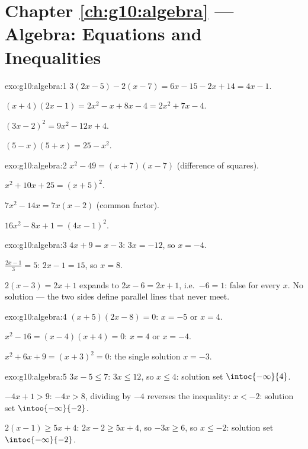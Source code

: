 \section*{Chapter \ref{ch:g10:algebra} --- Algebra: Equations and Inequalities}

\begin{solution}{exo:g10:algebra:1}
$3(2x-5) - 2(x-7) = 6x - 15 - 2x + 14 = 4x - 1$.

$(x+4)(2x-1) = 2x^2 - x + 8x - 4 = 2x^2 + 7x - 4$.

$(3x-2)^2 = 9x^2 - 12x + 4$.

$(5-x)(5+x) = 25 - x^2$.
\end{solution}

\begin{solution}{exo:g10:algebra:2}
$x^2 - 49 = (x+7)(x-7)$ (difference of squares).

$x^2 + 10x + 25 = (x+5)^2$.

$7x^2 - 14x = 7x(x - 2)$ (common factor).

$16x^2 - 8x + 1 = (4x - 1)^2$.
\end{solution}

\begin{solution}{exo:g10:algebra:3}
$4x + 9 = x - 3$: $3x = -12$, so $x = -4$.

$\frac{2x-1}{3} = 5$: $2x - 1 = 15$, so $x = 8$.

$2(x-3) = 2x + 1$ expands to $2x - 6 = 2x + 1$, i.e.\ $-6 = 1$: false for
every $x$. No solution --- the two sides define parallel lines that never
meet.
\end{solution}

\begin{solution}{exo:g10:algebra:4}
$(x+5)(2x-8) = 0$: $x = -5$ or $x = 4$.

$x^2 - 16 = (x-4)(x+4) = 0$: $x = 4$ or $x = -4$.

$x^2 + 6x + 9 = (x+3)^2 = 0$: the single solution $x = -3$.
\end{solution}

\begin{solution}{exo:g10:algebra:5}
$3x - 5 \leq 7$: $3x \leq 12$, so $x \leq 4$: solution set
$\intoc{-\infty}{4}$.

$-4x + 1 > 9$: $-4x > 8$, dividing by $-4$ reverses the inequality:
$x < -2$: solution set $\intoo{-\infty}{-2}$.

$2(x-1) \geq 5x + 4$: $2x - 2 \geq 5x + 4$, so $-3x \geq 6$, so
$x \leq -2$: solution set $\intoc{-\infty}{-2}$.
\end{solution}

